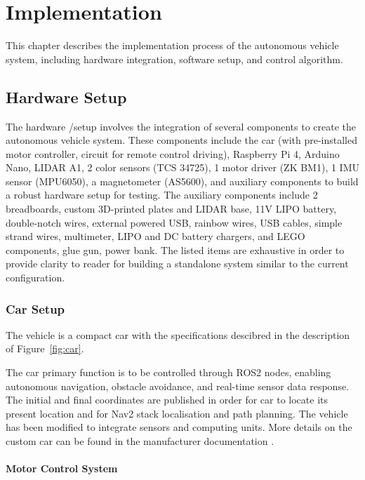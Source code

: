 \documentclass[english,project]{buwthesis}
\begin{document}
\chapter{Implementation}

This chapter describes the implementation process of the autonomous vehicle system, including hardware integration, software setup, and control algorithm. 

\section{Hardware Setup}

The hardware /setup involves the integration of several components to create the autonomous vehicle system. 
These components include the car (with pre-installed motor controller, circuit for remote control driving), Raspberry Pi 4,
Arduino Nano, LIDAR A1, 2 color sensors (TCS 34725), 1 motor driver (ZK BM1), 1 IMU sensor (MPU6050), a magnetometer (AS5600), and auxiliary components to build a robust hardware setup for testing. 
The auxiliary components include 2 breadboards, custom 3D-printed plates and LIDAR base, 11V LIPO battery, double-notch wires, external powered USB, rainbow wires, USB cables, simple strand wires, multimeter, LIPO and DC battery chargers, and LEGO components, glue gun, power bank. 
The listed items are exhaustive in order to provide clarity to reader for building a standalone system similar to the current configuration.


\subsection{Car Setup}
The vehicle is a compact car with the specifications descibred in the description of  Figure~\ref{fig:car}.


\sloppy
The car primary function is to be controlled through ROS2 nodes, enabling autonomous navigation, obstacle avoidance, 
and real-time sensor data response. The initial and final coordinates are published in order for car to locate 
its present location and for Nav2 stack localisation and path planning.
The vehicle has been modified to integrate sensors and computing units. 
More details on the custom car can be found in the manufacturer documentation \cite{BBH011_manual}
.

\subsubsection{Motor Control System}
\end{document}
